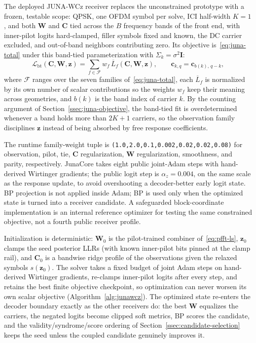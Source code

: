 \documentclass[journal]{IEEEtran}
\newcommand{\junawcz}{JUNA-WCz}
\begin{document}
The deployed \junawcz{} receiver replaces the unconstrained prototype with a
frozen, testable scope: QPSK, one OFDM symbol per solve, ICI half-width
$K{=}1$, and both $\mathbf W$ and $\mathbf C$ tied across the $B$ frequency
bands of the front end, with inner-pilot logits hard-clamped, filler symbols
fixed and known, the DC carrier excluded, and out-of-band neighbors
contributing zero. Its objective is~\eqref{eq:juna-total} under this
band-tied parameterization with $\Sigma_k=\sigma^2\mathbf I$:
\begin{equation}
  \mathcal L_{\mathrm{bt}}(\mathbf C,\mathbf W,\mathbf z)
  =\sum_{f\in\mathcal F} w_f\,\overline{L}_f(\mathbf C,\mathbf W,\mathbf z),
  \qquad
  \mathbf c_{k,q}=\mathbf c_{b(k),\,q-k},
  \label{eq:juna-wcz}
\end{equation}
where $\mathcal F$ ranges over the seven families
of~\eqref{eq:juna-total}, each $\overline{L}_f$ is normalized by its own
number of scalar contributions so the weights $w_f$ keep their meaning across
geometries, and $b(k)$ is the band index of carrier $k$. By the counting
argument of Section~\ref{ssec:juna-objective}, the band-tied fit is
overdetermined whenever a band holds more than $2K{+}1$ carriers, so the
observation family disciplines $\mathbf z$ instead of being absorbed by free
response coefficients.

The runtime family-weight tuple is
\texttt{(1.0,2.0,0.1,0.002,0.02,0.02,0.08)} for observation, pilot, tie,
$\mathbf C$ regularization, $\mathbf W$ regularization, smoothness, and parity,
respectively. JunaCore takes eight public joint-Adam steps with hand-derived
Wirtinger gradients; the public logit step is $\alpha_z=0.004$, on the same
scale as the response update, to avoid overshooting a decoder-better early
logit state. BP projection is not applied inside Adam; BP is used only
when the optimized state is turned into a receiver candidate. A safeguarded
block-coordinate implementation is an internal reference optimizer for testing
the same constrained objective, not a fourth public receiver profile.

Initialization is deterministic: $\mathbf W_0$ is the pilot-trained combiner
of~\eqref{eq:pfft-ls}, $\mathbf z_0$ clamps the seed posterior LLRs (with
known inner-pilot bits pinned at the clamp rail), and $\mathbf C_0$ is a
bandwise ridge profile of the observations given the relaxed symbols
$s(\mathbf z_0)$. The solver takes a fixed budget of joint Adam steps on
hand-derived Wirtinger gradients, re-clamps inner-pilot logits after every
step, and retains the best finite objective checkpoint, so optimization can
never worsen its own scalar objective
(Algorithm~\ref{alg:junawcz}). The optimized state re-enters the decoder
boundary exactly as the other receivers do: the best $\mathbf W$ equalizes the
carriers, the negated logits become clipped soft metrics, BP scores the
candidate, and the validity/syndrome/score ordering of
Section~\ref{ssec:candidate-selection} keeps the seed unless the coupled
candidate genuinely improves it.
\end{document}
